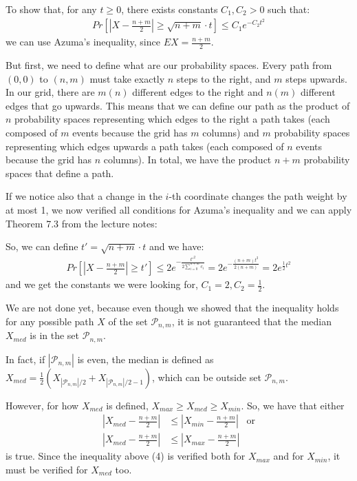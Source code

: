 \documentclass[a4paper,german]{article}
\begin{document}
To show that, for any $t \geq 0$, there exists constants $C_1, C_2 > 0$ such that:
\begin{align}
	Pr\left[| X - \frac{n+m}{2} | \geq \sqrt{n+m}\cdot t\right] \leq C_1 e ^{-C_2 t^2}
\end{align}
we can use Azuma's inequality, since $EX = \frac{n+m}{2}$.

But first, we need to define what are our probability spaces.  Every path from
$(0,0)$ to $(n,m)$ must take exactly $n$ steps to the right, and $m$ steps
upwards. In our grid, there are $m(n)$ different
edges to the right and $n(m)$ different edges that go upwards. This means that
we can define our path as the product of $n$ probability spaces representing
which edges to the right a path takes (each composed of $m$ events because the
grid has $m$ columns) and $m$ probability spaces representing which edges
upwards a path takes (each composed of $n$ events because the grid has $n$
columns). In total, we have the product $n+m$ probability spaces that define a
path.

If we notice also that a change in the $i$-th coordinate changes the path
weight by at most 1, we now verified all conditions for Azuma's inequality
and we can apply Theorem 7.3 from the lecture notes:

So, we can define $t' = \sqrt{n+m} \cdot t$ and we have:
\begin{align}
	Pr\left[| X - \frac{n+m}{2} | \geq  t'\right] \leq 2e^{- \frac{t'^2} {2\sum_{i=0}^{n+m} c_i}} = 2e^{- \frac{(n+m)t^2}{2(n+m)}} = 2e^{\frac{1}{2}t^2}
\end{align}
and we get the constants we were looking for, $C_1 = 2, C_2 = \frac{1}{2}$.

We are not done yet, because even though we showed that the inequality
holds for any possible path $X$ of the set $\mathcal{P}_{n,m}$, it is not guaranteed that the median $X_{med}$ is in the set $\mathcal{P}_{n,m}$.

In fact, if $| \mathcal{P}_{n,m} | $ is even, the median is defined as 
$X_{med} = \frac{1}{2}(X_{|\mathcal{P}_{n,m}|/2} + X_{|\mathcal{P}_{n,m}|/2-1} )$, which can be outside set $\mathcal{P}_{n,m}$.

However, for how $X_{med}$ is defined, $X_{max} \geq X_{med} \geq X_{min}$.
So, we have that either
\begin{align*}
	| X_{med} - \frac{n+m}{2} | &\leq
	| X_{min} - \frac{n+m}{2} |  \;\;\; \text{or}\\
	| X_{med} - \frac{n+m}{2} | &\leq
	| X_{max} - \frac{n+m}{2} | 
\end{align*}
is true. Since the inequality above (4) is verified both for $X_{max}$ and for
$X_{min}$, it must be verified for $X_{med}$ too.
\end{document}

